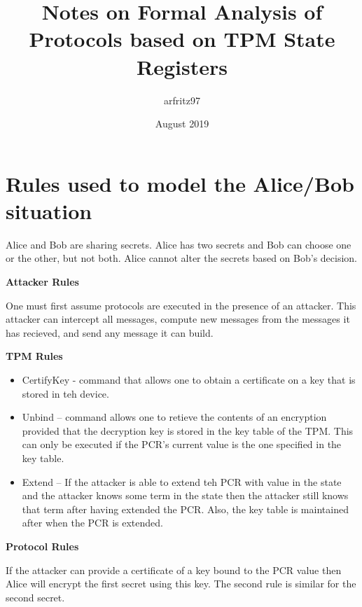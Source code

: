 \documentclass{article}
\title{Notes on Formal Analysis of Protocols based on TPM State Registers}
\author{arfritz97 }
\date{August 2019}
\begin{document}
\section {Rules used to model the Alice/Bob situation}

Alice and Bob are sharing secrets. Alice has two secrets and
Bob can choose one or the other, but not both. Alice cannot 
alter the secrets based on Bob's decision.


\textbf {Attacker Rules}

\begin{itemize}
 
One must first assume protocols are executed in the presence
of an attacker. This attacker can intercept all messages,
compute new messages from the messages it has recieved,
and send any message it can build.

\end{itemize}

\textbf {TPM Rules}

\begin{itemize}

\item CertifyKey - command that allows one to obtain a certificate
on a key that is stored in teh device. 

\item Unbind -- command allows one to retieve the contents of an
encryption provided that the decryption key is stored in 
the key table of the TPM. This can only be executed if the 
PCR's current value is the one specified in the key table.

\item Extend -- If the attacker is able to extend teh PCR with value
in the state and the attacker knows some term in the state then
the attacker still knows that term after having extended
the PCR. Also, the key table is maintained after when the 
PCR is extended.

\end{itemize}

\textbf {Protocol Rules}
\begin{itemize}
If the attacker can provide a certificate of a key bound to 
the PCR value then Alice will encrypt the first secret using 
this key. The second rule is similar for the second secret.
\end{itemize}
\end{document}
